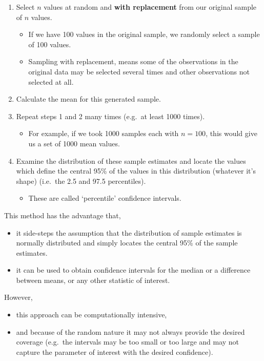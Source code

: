 \documentclass[
  oneside]{krantz}
\providecommand{\tightlist}{%
  \setlength{\itemsep}{0pt}\setlength{\parskip}{0pt}}
\begin{document}
\begin{enumerate}
\def\labelenumi{\arabic{enumi}.}
\item
  Select \(n\) values at random and \textbf{with replacement} from our original sample of \(n\) values.

  \begin{itemize}
  \tightlist
  \item
    If we have 100 values in the original sample, we randomly select a sample of 100 values.
  \item
    Sampling with replacement, means some of the observations in the original data may be selected several times and other observations not selected at all.
  \end{itemize}
\item
  Calculate the mean for this generated sample.
\item
  Repeat steps 1 and 2 many times (e.g.~at least 1000 times).

  \begin{itemize}
  \tightlist
  \item
    For example, if we took 1000 samples each with \(n=100\), this would give us a set of 1000 mean values.
  \end{itemize}
\item
  Examine the distribution of these sample estimates and locate the values which define the central 95\% of the values in this distribution (whatever it's shape) (i.e.~the 2.5 and 97.5 percentiles).

  \begin{itemize}
  \tightlist
  \item
    These are called `percentile' confidence intervals.
  \end{itemize}
\end{enumerate}

This method has the advantage that,

\begin{itemize}
\tightlist
\item
  it side-steps the assumption that the distribution of sample estimates is normally distributed and simply locates the central 95\% of the sample estimates.
\item
  it can be used to obtain confidence intervals for the median or a difference between means, or any other statistic of interest.
\end{itemize}

However,

\begin{itemize}
\tightlist
\item
  this approach can be computationally intensive,
\item
  and because of the random nature it may not always provide the desired coverage (e.g.~the intervals may be too small or too large and may not capture the parameter of interest with the desired confidence).
\end{itemize}
\end{document}
